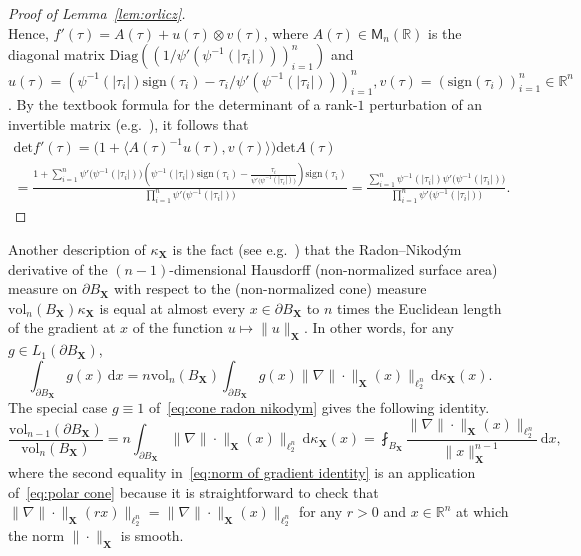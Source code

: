 \documentclass[11pt,reqno]{amsart}
\newcommand{\ud}[0]{\,\mathrm{d}}
\renewcommand{\det}{\mathrm{det}}
\newcommand{\sign}{\mathrm{sign}}
\newcommand{\X}{\mathbf X}
\newcommand{\R}{\mathbb R}
\theoremstyle{remark}
\newcommand{\M}{\mathsf{M}}
\newcommand{\vol}{\mathrm{vol}}
\renewcommand{\1}{\mathbf 1}
\begin{document}
\begin{proof}[Proof of Lemma~\ref{lem:orlicz}]
$$$$
Hence, $f'(\tau)=A(\tau)+u(\tau)\otimes v(\tau)$, where $A(\tau)\in \M_n(\R)$ is the diagonal matrix $\mathrm{Diag}((1/\psi'(\psi^{-1}(|\tau_i|)))_{i=1}^n)$ and  $u(\tau)=(\psi^{-1}(|\tau_i|)\sign(\tau_i)-\tau_i/\psi'(\psi^{-1}(|\tau_i|)))_{i=1}^n, v(\tau)=(\sign(\tau_i))_{i=1}^n\in \R^n$. By the textbook formula for the determinant of a rank-$1$ perturbation of an invertible matrix (e.g.~\cite[Section~6.2]{Mey00}), it follows that
\begin{multline*}
\det f'(\tau)=\big(1+\langle A(\tau)^{-1}u(\tau),v(\tau)\rangle\big)  \det A(\tau)\\
=\frac{1+\sum_{i=1}^n \psi'\big(\psi^{-1}(|\tau_i|)\big)\left(\psi^{-1}(|\tau_i|)\sign(\tau_i)-\frac{\tau_i}{\psi'\big(\psi^{-1}(|\tau_i|)\big)}\right)\sign(\tau_i)}
{\prod_{i=1}^n\psi'\big(\psi^{-1}(|\tau_i|)\big)}= \frac{\sum_{i=1}^n \psi^{-1}(|\tau_i|)\psi'\big(\psi^{-1}(|\tau_i|)\big)}{\prod_{i=1}^n\psi'\big(\psi^{-1}(|\tau_i|)\big)}. \tag*{\qedhere}
\end{multline*}

\end{proof}

Another description of $\kappa_{\X}$  is the fact (see e.g.~\cite[Lemma~1]{NR03}) that   the Radon--Nikod\'ym derivative  of the $(n-1)$-dimensional Hausdorff (non-normalized surface area) measure on $\partial B_{\X}$ with respect to the (non-normalized cone) measure $\vol_n(B_{\X})\kappa_{\X}$ is equal at almost every $x\in \partial B_{\X}$ to $n$ times the Euclidean length of the gradient at $x$ of the function $u\mapsto\|u\|_{\X}$. In other words, for any $g\in L_1(\partial B_{\X})$,
\begin{equation}\label{eq:cone radon nikodym}
\int_{\partial B_{\X}} g(x)\ud x= n\vol_n(B_{\X})\int_{\partial B_{\X}}g(x)\big\|\nabla\|\cdot\|_{\X}(x)\big\|_{\ell_2^n}\ud\kappa_{\X}(x).
\end{equation}
The special case $g\equiv 1$ of~\eqref{eq:cone radon nikodym} gives the following identity.
\begin{equation}\label{eq:norm of gradient identity}
\frac{\vol_{n-1}(\partial B_{\X})}{\vol_n(B_{\X})}=n\int_{\partial B_{\X}} \big\|\nabla\|\cdot\|_{\X}(x)\big\|_{\ell_2^n}\ud\kappa_{\X}(x)=\fint_{B_{\X}}\frac{\|\nabla\|\cdot\|_{\X}(x)\|_{\ell_2^n}}{\|x\|_{\X}^{n-1}}\ud x,
\end{equation}
where the second equality in~\eqref{eq:norm of gradient identity} is an application of~\eqref{eq:polar cone} because it is straightforward to check that $\|\nabla\|\cdot\|_{\X}(rx)\|_{\ell_2^n}=\|\nabla\|\cdot\|_{\X}(x)\|_{\ell_2^n}$ for any $r>0$ and  $x\in \R^n$ at which the norm $\|\cdot\|_{\X}$ is smooth.
\end{document}
